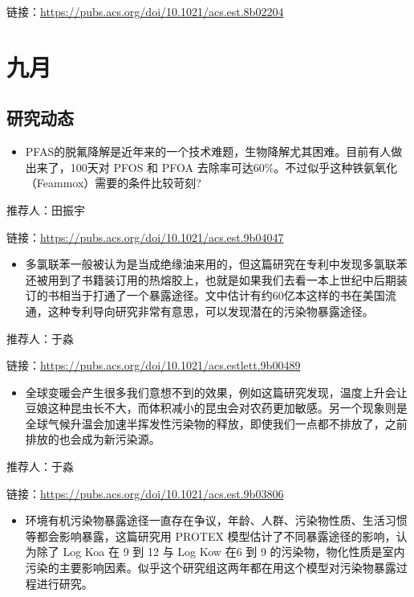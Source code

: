 \documentclass[
]{book}
\providecommand{\tightlist}{%
  \setlength{\itemsep}{0pt}\setlength{\parskip}{0pt}}
\begin{document}
链接：\url{https://pubs.acs.org/doi/10.1021/acs.est.8b02204}

\hypertarget{ux4e5dux6708-1}{%
\section*{九月}\label{ux4e5dux6708-1}}

\hypertarget{ux7814ux7a76ux52a8ux6001-22}{%
\subsection*{研究动态}\label{ux7814ux7a76ux52a8ux6001-22}}

\begin{itemize}
\tightlist
\item
  PFAS的脱氟降解是近年来的一个技术难题，生物降解尤其困难。目前有人做出来了，100天对 PFOS 和 PFOA 去除率可达60\%。不过似乎这种铁氨氧化（Feammox）需要的条件比较苛刻?
\end{itemize}

推荐人：田振宇

链接：\url{https://pubs.acs.org/doi/10.1021/acs.est.9b04047}

\begin{itemize}
\tightlist
\item
  多氯联苯一般被认为是当成绝缘油来用的，但这篇研究在专利中发现多氯联苯还被用到了书籍装订用的热熔胶上，也就是如果我们去看一本上世纪中后期装订的书相当于打通了一个暴露途径。文中估计有约60亿本这样的书在美国流通，这种专利导向研究非常有意思，可以发现潜在的污染物暴露途径。
\end{itemize}

推荐人：于淼

链接：\url{https://pubs.acs.org/doi/10.1021/acs.estlett.9b00489}

\begin{itemize}
\tightlist
\item
  全球变暖会产生很多我们意想不到的效果，例如这篇研究发现，温度上升会让豆娘这种昆虫长不大，而体积减小的昆虫会对农药更加敏感。另一个现象则是全球气候升温会加速半挥发性污染物的释放，即使我们一点都不排放了，之前排放的也会成为新污染源。
\end{itemize}

推荐人：于淼

链接：\url{https://pubs.acs.org/doi/10.1021/acs.est.9b03806}

\begin{itemize}
\tightlist
\item
  环境有机污染物暴露途径一直存在争议，年龄、人群、污染物性质、生活习惯等都会影响暴露，这篇研究用 PROTEX 模型估计了不同暴露途径的影响，认为除了 Log Koa 在 9 到 12 与 Log Kow 在6 到 9 的污染物，物化性质是室内污染的主要影响因素。似乎这个研究组这两年都在用这个模型对污染物暴露过程进行研究。
\end{itemize}
\end{document}
